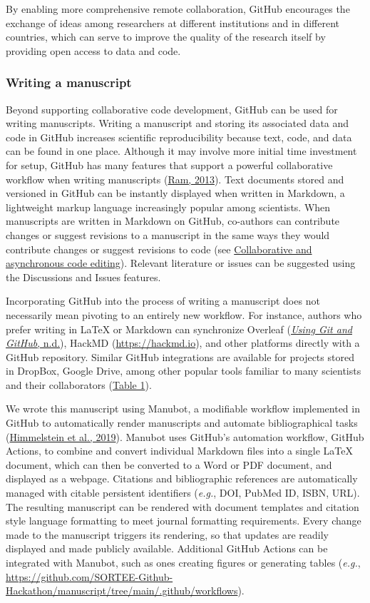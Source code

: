 By enabling more comprehensive remote collaboration, GitHub encourages the exchange of ideas among researchers at different institutions and in different countries, which can serve to improve the quality of the research itself by providing open access to data and code.

\hypertarget{writing-manuscript}{%
\subsubsection{Writing a manuscript}\label{writing-manuscript}}

Beyond supporting collaborative code development, GitHub can be used for writing manuscripts.
Writing a manuscript and storing its associated data and code in GitHub increases scientific reproducibility because text, code, and data can be found in one place.
Although it may involve more initial time investment for setup, GitHub has many features that support a powerful collaborative workflow when writing manuscripts (\protect\hyperlink{ref-4ny1onB0}{Ram, 2013}).
Text documents stored and versioned in GitHub can be instantly displayed when written in Markdown, a lightweight markup language increasingly popular among scientists.
When manuscripts are written in Markdown on GitHub, co-authors can contribute changes or suggest revisions to a manuscript in the same ways they would contribute changes or suggest revisions to code (see \protect\hyperlink{code-editing}{Collaborative and asynchronous code editing}).
Relevant literature or issues can be suggested using the Discussions and Issues features.

Incorporating GitHub into the process of writing a manuscript does not necessarily mean pivoting to an entirely new workflow.
For instance, authors who prefer writing in LaTeX or Markdown can synchronize Overleaf (\protect\hyperlink{ref-oGbKxHzj}{\emph{Using Git and GitHub}, n.d.}), HackMD (\url{https://hackmd.io}), and other platforms directly with a GitHub repository.
Similar GitHub integrations are available for projects stored in DropBox, Google Drive, among other popular tools familiar to many scientists and their collaborators (\protect\hyperlink{tbl:compare}{Table 1}).

We wrote this manuscript using Manubot, a modifiable workflow implemented in GitHub to automatically render manuscripts and automate bibliographical tasks (\protect\hyperlink{ref-YuJbg3zO}{Himmelstein et al., 2019}).
Manubot uses GitHub's automation workflow, GitHub Actions, to combine and convert individual Markdown files into a single LaTeX document, which can then be converted to a Word or PDF document, and displayed as a webpage.
Citations and bibliographic references are automatically managed with citable persistent identifiers (\emph{e.g.}, DOI, PubMed ID, ISBN, URL).
The resulting manuscript can be rendered with document templates and citation style language formatting to meet journal formatting requirements.
Every change made to the manuscript triggers its rendering, so that updates are readily displayed and made publicly available.
Additional GitHub Actions can be integrated with Manubot, such as ones creating figures or generating tables (\emph{e.g.}, \url{https://github.com/SORTEE-Github-Hackathon/manuscript/tree/main/.github/workflows}).

